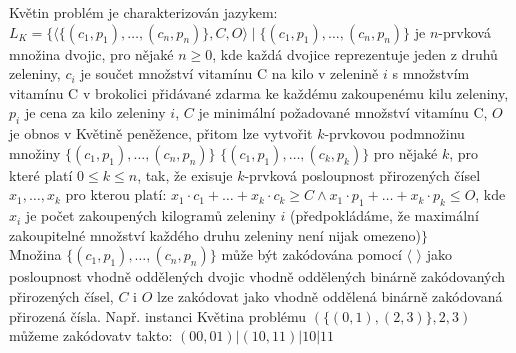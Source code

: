 \documentclass[a4paper,11pt]{article}[24.3.2010]
\begin{document}
\begin{enumerate}
Květin problém je charakterizován jazykem:\\
$L_{K}=\{\langle\{(c_{1},p_{1}),\dots,(c_{n},p_{n})\},C,O\rangle\mid\{(c_{1},p_{1}),\dots,(c_{n},p_{n})\}$ je $n$-prvková množina dvojic, pro nějaké $n\geq 0$, kde každá dvojice reprezentuje jeden z druhů zeleniny, $c_{i}$ je součet množství vitamínu C na kilo v zelenině $i$ s množstvím vitamínu C v brokolici přidávané zdarma ke každému zakoupenému kilu zeleniny, $p_{i}$ je cena za kilo zeleniny $i$, $C$ je minimální požadované množství vitamínu C, $O$ je obnos v Květině peněžence, přitom lze vytvořit $k$-prvkovou podmnožinu množiny $\{(c_{1},p_{1}),\dots,(c_{n},p_{n})\}$ $\{(c_{1},p_{1}),\dots,(c_{k},p_{k})\}$ pro nějaké $k$, pro které platí $0\leq k\leq n$, tak, že exisuje $k$-prvková posloupnost přirozených čísel $x_{1},\dots,x_{k}$ pro kterou platí: $x_{1}\cdot c_{1}+\dots+x_{k}\cdot c_{k}\geq C \wedge x_{1}\cdot p_{1}+\dots+x_{k}\cdot p_{k}\leq O$, kde $x_{i}$ je počet zakoupených kilogramů zeleniny $i$ (předpokládáme, že maximální zakoupitelné množství každého druhu zeleniny není nijak omezeno)$\}$\\


Množina $\{(c_{1},p_{1}),\dots,(c_{n},p_{n})\}$ může být zakódována pomocí $\langle$ $\rangle$ jako posloupnost vhodně oddělených dvojic vhodně oddělených binárně zakódovaných přirozených čísel, $C$ i $O$ lze zakódovat jako vhodně oddělená binárně zakódovaná přirozená čísla. Např. instanci Květina problému $(\{(0,1),(2,3)\},2,3)$ můžeme zakódovatv takto:
$(00,01)|(10,11)|10|11$


\end{enumerate}
\end{document}
